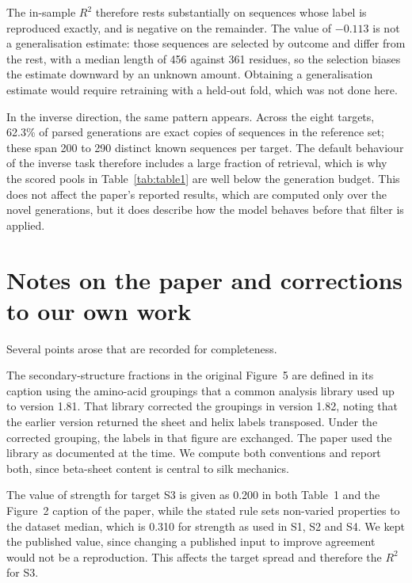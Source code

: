 \documentclass[11pt,a4paper]{article}
\begin{document}
The in-sample $R^2$ therefore rests substantially on sequences whose label is
reproduced exactly, and is negative on the remainder. The value of $-0.113$ is
not a generalisation estimate: those sequences are selected by outcome and differ
from the rest, with a median length of 456 against 361 residues, so the
selection biases the estimate downward by an unknown amount. Obtaining a
generalisation estimate would require retraining with a held-out fold, which was
not done here.

In the inverse direction, the same pattern appears. Across the eight targets,
62.3\% of parsed generations are exact copies of sequences in the reference set;
these span 200 to 290 distinct known sequences per target. The default behaviour
of the inverse task therefore includes a large fraction of retrieval, which is
why the scored pools in Table~\ref{tab:table1} are well below the generation
budget. This does not affect the paper's reported results, which are computed
only over the novel generations, but it does describe how the model behaves
before that filter is applied.

\section{Notes on the paper and corrections to our own work}

Several points arose that are recorded for completeness.

The secondary-structure fractions in the original Figure~5 are defined in its
caption using the amino-acid groupings that a common analysis library used up to
version 1.81. That library corrected the groupings in version 1.82, noting that
the earlier version returned the sheet and helix labels transposed. Under the
corrected grouping, the labels in that figure are exchanged. The paper used the
library as documented at the time. We compute both conventions and report both,
since beta-sheet content is central to silk mechanics.

The value of strength for target S3 is given as 0.200 in both Table~1 and the
Figure~2 caption of the paper, while the stated rule sets non-varied properties
to the dataset median, which is 0.310 for strength as used in S1, S2 and S4. We
kept the published value, since changing a published input to improve agreement
would not be a reproduction. This affects the target spread and therefore the
$R^2$ for S3.
\end{document}
